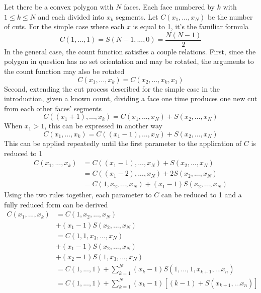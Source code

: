 \documentclass[12pt]{article}
\begin{document}
Let there be a convex polygon with $N$ faces. Each face numbered by $k$ with
$1 \le k \le N$ and each divided into $x_k$ segments.
Let $C(x_1,...,x_N)$ be the number of
cuts. For the simple case where each $x$ is equal to 1, it's the familiar
formula
\begin{equation}
    C(1,...,1) = S(N-1,...,0) = \frac{N (N - 1)}{2}
\end{equation}
In the general case, the count function satisfies a couple relations. First,
since the polygon in question has no set orientation and may be rotated, the
arguments to the count function may also be rotated
\begin{equation}
    C(x_1,...,x_k) = C(x_2,...,x_k,x_1)
\end{equation}
Second, extending the cut process described for the simple case in the introduction,
given a known count, dividing a face one time produces one new cut from each other faces'
segments
\begin{equation}
    C((x_1 + 1),...,x_k) = C(x_1,...,x_N) + S(x_2,...,x_N)
\end{equation}
When $x_1 > 1$, this can be expressed in another way
\begin{equation}
    C(x_1,...,x_k) = C((x_1 - 1),...,x_N) + S(x_2,...,x_N)
\end{equation}
This can be applied repeatedly until the first parameter to the application of $C$ is
reduced to 1
\begin{equation}
\begin{aligned}
    C(x_1,...,x_k) &= C((x_1 - 1),...,x_N) +           S(x_2,...,x_N) \\
                   &= C((x_1 - 2),...,x_N) +         2 S(x_2,...,x_N) \\
                   &= C(1,x_2,...,x_N)     + (x_1 - 1) S(x_2,...,x_N)
\end{aligned}
\end{equation}
Using the two rules together, each parameter to $C$ can be reduced to 1
and a fully reduced form can be derived
\begin{equation}
\begin{aligned}
    C(x_1,...,x_k) &= C(1,x_2,...,x_N) \\
                   &+ (x_1 - 1) S(x_2,...,x_N) \\
                   &= C(1,1,x_3,...,x_N) \\
                   &+ (x_1 - 1) S(x_2,...,x_N) \\
                   &+ (x_2 - 1) S(1,x_3,...,x_N) \\
                   &= C(1,...,1) + \sum_{k=1}^{N} (x_k - 1) S(1,...,1,x_{k+1},...x_n) \\
                   &= C(1,...,1) + \sum_{k=1}^{N} (x_k - 1) \left[ (k-1) + S(x_{k+1},...x_n) \right] \\
\end{aligned}
\end{equation}
\end{document}
